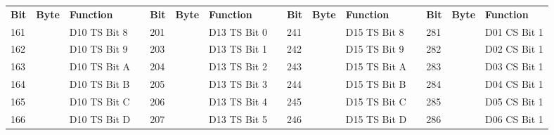 \documentclass[]{article}
\begin{document}
\begin{landscape}
	\begin{table}[]
		\footnotesize
		\begin{tabular}{lllllllllllllll}
			\cline{1-3} \cline{5-7} \cline{9-11} \cline{13-15}
			\textbf{Bit} & \textbf{Byte}        & \textbf{Function} &                    & \textbf{Bit} & \textbf{Byte}        & \textbf{Function} &  & \textbf{Bit} & \textbf{Byte}        & \textbf{Function} &  & \textbf{Bit}             & \textbf{Byte}                              & \textbf{Function}        \\ \cline{1-3} \cline{5-7} \cline{9-11} \cline{13-15} 
			161          &                      & D10 TS Bit 8      &                    & 201          &                      & D13 TS Bit 0      &  & 241          &                      & D15 TS Bit 8      &  & 281                      &                                            & D01 CS Bit 1             \\
			162          &                      & D10 TS Bit 9      &                    & 203          &                      & D13 TS Bit 1      &  & 242          &                      & D15 TS Bit 9      &  & 282                      &                                            & D02 CS Bit 1             \\
			163          &                      & D10 TS Bit A      &                    & 204          &                      & D13 TS Bit 2      &  & 243          &                      & D15 TS Bit A      &  & 283                      &                                            & D03 CS Bit 1             \\
			164          &                      & D10 TS Bit B      &                    & 205          &                      & D13 TS Bit 3      &  & 244          &                      & D15 TS Bit B      &  & 284                      &                                            & D04 CS Bit 1             \\
			165          &                      & D10 TS Bit C      &                    & 206          &                      & D13 TS Bit 4      &  & 245          &                      & D15 TS Bit C      &  & 285                      &                                            & D05 CS Bit 1             \\
			166          &                      & D10 TS Bit D      &                    & 207          &                      & D13 TS Bit 5      &  & 246          &                      & D15 TS Bit D      &  & 286                      &                                            & D06 CS Bit 1             \\

\end{tabular}
\end{table}
\end{landscape}
\end{document}
